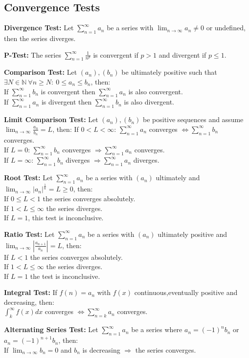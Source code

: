 \documentclass[8pt,a4paper]{extarticle}     %
\theoremstyle{definition}
\theoremstyle{definition}
\theoremstyle{definition}
\newcommand{\N}{\mathbb{N}}
\begin{document}
\begin{multicols}{4}
\subsection{Convergence Tests}
\begin{eqlist}
	\item \textbf{Divergence Test:} Let $\sum_{n=1}^\infty a_n$ be a series with $\lim_{n\to\infty} a_n \neq 0$ or undefined, then the series diverges.
	\item \textbf{P-Test: } The series $\sum_{n=1}^\infty \frac{1}{n^p}$ is convergent if $p>1$ and divergent if $p\leq1$.
	\item \textbf{Comparison Test:} Let $(a_n), (b_n)$ be ultimately positive such that $\exists N\in\N \ \forall n \geq N: \ 0\leq a_n \leq b_n$, then: \\
	If $\sum_{n=1}^\infty b_n$ is convergent then $\sum_{n=1}^\infty a_n$ is also convergent. \\
	If $\sum_{n=1}^\infty a_n$ is divergent then $\sum_{n=1}^\infty b_n$ is also divergent.
	\item \textbf{Limit Comparison Test:} Let $(a_n), (b_n)$ be positive sequences and assume $\lim_{n\to\infty} \frac{a_n}{b_n} = L$, then:
	If $0<L<\infty$: $\sum_{n=1}^\infty a_n$ converges $\Leftrightarrow \sum_{n=1}^\infty b_n$ converges. \\
	If $L=0$: $\sum_{n=1}^\infty b_n$ converges $\Rightarrow \sum_{n=1}^\infty a_n$ converges.\\
	If $L=\infty$: $\sum_{n=1}^\infty b_n$ diverges $\Rightarrow \sum_{n=1}^\infty a_n$ diverges.
	\item \textbf{Root Test:} Let $\sum_{n=1}^\infty a_n$ be a series with $(a_n)$ ultimately and $\lim_{n\to\infty} |a_n|^{\frac{1}{n}} = L \geq 0$, then: \\
	If $0\leq L<1$ the series converges absolutely.\\
	If $1<L\leq\infty$ the series diverges. \\
	If $L=1$, this test is inconclusive.
	\item \textbf{Ratio Test:} Let $\sum_{n=1}^\infty a_n$ be a series with $(a_n)$ ultimately positive and $\lim_{n\to\infty}\left|\frac{a_{n+1}}{a_n}\right| = L$, then: \\
	If $L<1$ the series converges absolutely.\\
	If $1<L\leq\infty$ the series diverges. \\
	If $L=1$ the test is inconclusive.
	\item \textbf{Integral Test:} If $f(n) = a_n$ with $f(x)$ continuous,eventually positive and decreasing, then: \\
	$\int_k^\infty f(x)dx$ converges $\Leftrightarrow \sum_{n=k}^\infty a_n$ converges.
	\item \textbf{Alternating Series Test:} Let $\sum_{n=1}^\infty a_n$ be a series where $a_n = (-1)^nb_n$ or $a_n = (-1)^{n+1}b_n$, then: \\
	If $\lim_{n\to\infty}b_n=0$ and $b_n$ is decreasing $\Rightarrow$ the series converges.
\end{eqlist}

\end{multicols}
\end{document}
